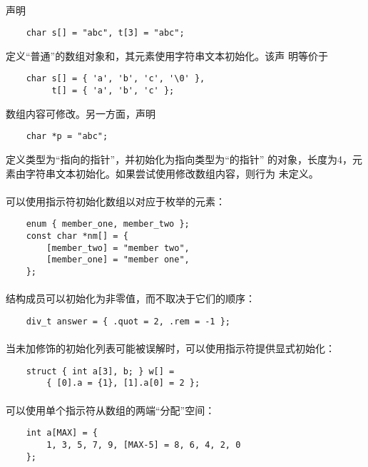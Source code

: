 \paragraph{}
\ex 声明
\begin{lstlisting}
    char s[] = "abc", t[3] = "abc";
\end{lstlisting}
定义``普通''的数组对象和，其元素使用字符串文本初始化。该声
明等价于
\begin{lstlisting}
    char s[] = { 'a', 'b', 'c', '\0' },
         t[] = { 'a', 'b', 'c' };
\end{lstlisting}
数组内容可修改。另一方面，声明
\begin{lstlisting}
    char *p = "abc";
\end{lstlisting}
定义类型为``指向的指针''，并初始化为指向类型为``的指针''
的对象，长度为4，元素由字符串文本初始化。如果尝试使用修改数组内容，则行为
未定义。

\paragraph{}
\ex 可以使用指示符初始化数组以对应于枚举的元素：
\begin{lstlisting}
    enum { member_one, member_two };
    const char *nm[] = {
        [member_two] = "member two",
        [member_one] = "member one",
    };
\end{lstlisting}

\paragraph{}
\ex 结构成员可以初始化为非零值，而不取决于它们的顺序：
\begin{lstlisting}
    div_t answer = { .quot = 2, .rem = -1 };
\end{lstlisting}

\paragraph{}
\ex 当未加修饰的初始化列表可能被误解时，可以使用指示符提供显式初始化：
\begin{lstlisting}
    struct { int a[3], b; } w[] =
        { [0].a = {1}, [1].a[0] = 2 };
\end{lstlisting}

\paragraph{}
\ex 可以使用单个指示符从数组的两端``分配''空间：
\begin{lstlisting}
    int a[MAX] = {
        1, 3, 5, 7, 9, [MAX-5] = 8, 6, 4, 2, 0
    };
\end{lstlisting}

